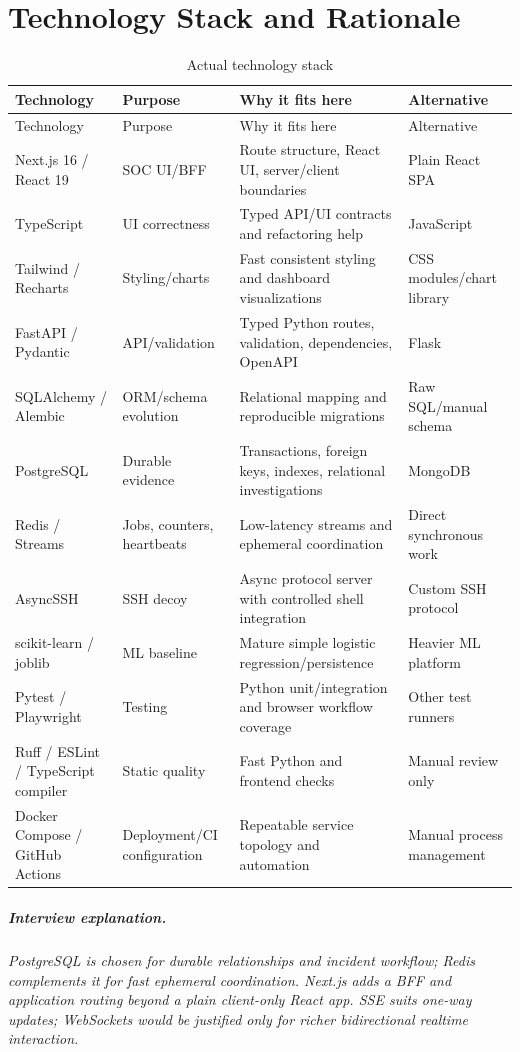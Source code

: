 \documentclass[11pt,oneside]{book}
\newcommand{\interview}[1]{\paragraph{Interview explanation.}\emph{#1}}
\begin{document}
\chapter{Technology Stack and Rationale}
\begin{longtable}{p{29mm}p{35mm}p{52mm}p{30mm}}\caption{Actual technology stack}\label{tab:stack}\\\toprule Technology & Purpose & Why it fits here & Alternative\\\midrule\endfirsthead\toprule Technology & Purpose & Why it fits here & Alternative\\\midrule\endhead
Next.js 16 / React 19 & SOC UI/BFF & Route structure, React UI, server/client boundaries & Plain React SPA\\
TypeScript & UI correctness & Typed API/UI contracts and refactoring help & JavaScript\\
Tailwind / Recharts & Styling/charts & Fast consistent styling and dashboard visualizations & CSS modules/chart library\\
FastAPI / Pydantic & API/validation & Typed Python routes, validation, dependencies, OpenAPI & Flask\\
SQLAlchemy / Alembic & ORM/schema evolution & Relational mapping and reproducible migrations & Raw SQL/manual schema\\
PostgreSQL & Durable evidence & Transactions, foreign keys, indexes, relational investigations & MongoDB\\
Redis / Streams & Jobs, counters, heartbeats & Low-latency streams and ephemeral coordination & Direct synchronous work\\
AsyncSSH & SSH decoy & Async protocol server with controlled shell integration & Custom SSH protocol\\
scikit-learn / joblib & ML baseline & Mature simple logistic regression/persistence & Heavier ML platform\\
Pytest / Playwright & Testing & Python unit/integration and browser workflow coverage & Other test runners\\
Ruff / ESLint / TypeScript compiler & Static quality & Fast Python and frontend checks & Manual review only\\
Docker Compose / GitHub Actions & Deployment/CI configuration & Repeatable service topology and automation & Manual process management\\\bottomrule\end{longtable}
\interview{PostgreSQL is chosen for durable relationships and incident workflow; Redis complements it for fast ephemeral coordination. Next.js adds a BFF and application routing beyond a plain client-only React app. SSE suits one-way updates; WebSockets would be justified only for richer bidirectional realtime interaction.}
\end{document}
